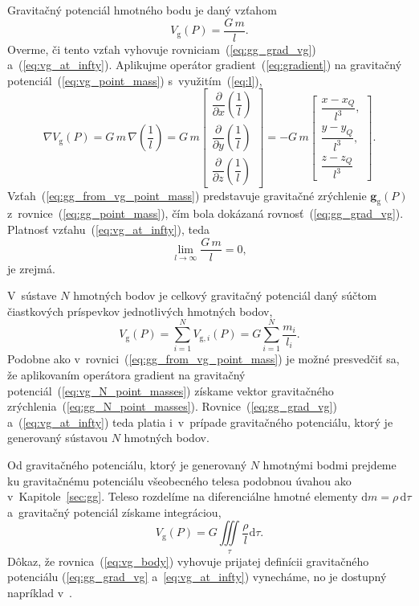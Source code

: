 \documentclass[a4paper,12pt]{book}
\newcommand{\diff}{\mathrm d}
\newcommand{\gidx}{\mathrm g}
\let\vec\mathbf
\begin{document}
Gravitačný potenciál hmotného bodu je daný vzťahom
%
\begin{equation}
\label{eq:vg_point_mass}
V_\gidx(P) = \frac{G \, m}{l}{.}
\end{equation}
%
Overme, či tento vzťah vyhovuje rovniciam~(\ref{eq:gg_grad_vg})
a~(\ref{eq:vg_at_infty}).  Aplikujme operátor gradient~(\ref{eq:gradient})
na gravitačný potenciál~(\ref{eq:vg_point_mass}) s~využitím~(\ref{eq:l}),
%
\begin{equation}
\label{eq:gg_from_vg_point_mass}
\nabla V_\gidx(P) = G \, m \, \nabla \left( \frac{1}{l} \right) =
%
G \, m
\begin{bmatrix}
\dfrac{\partial}{\partial x} \left( \dfrac{1}{l} \right)\\[2ex]
\dfrac{\partial}{\partial y} \left( \dfrac{1}{l} \right)\\[2ex]
\dfrac{\partial}{\partial z} \left( \dfrac{1}{l} \right)
\end{bmatrix}
%
=
%
-G \, m
%
\begin{bmatrix}
\dfrac{x - x_Q}{l^3}{,}\\[2ex]
\dfrac{y - y_Q}{l^3}{,}\\[2ex]
\dfrac{z - z_Q}{l^3}
\end{bmatrix}
{.}
\end{equation}
%
Vzťah~(\ref{eq:gg_from_vg_point_mass}) predstavuje gravitačné zrýchlenie $\vec 
g_\gidx(P)$ z~rovnice~(\ref{eq:gg_point_mass}), čím bola dokázaná 
rovnosť~(\ref{eq:gg_grad_vg}).  Platnosť vzťahu~(\ref{eq:vg_at_infty}), teda
%
\begin{equation}
\lim_{l \to \infty} \frac{G \, m}{l} = 0{,}
\end{equation}
%
je zrejmá.

V~sústave $N$ hmotných bodov je celkový gravitačný potenciál daný súčtom
čiastkových príspevkov jednotlivých hmotných bodov,
%
\begin{equation}
\label{eq:vg_N_point_masses}
V_\gidx(P) = \sum_{i = 1}^{N} V_{\gidx,i}(P) = G \sum_{i = 1}^{N}\frac{
m_i}{l_i}{.}
\end{equation}
%
Podobne ako v~rovnici~(\ref{eq:gg_from_vg_point_mass}) je možné
presvedčiť sa, že aplikovaním operátora gradient na gravitačný
potenciál~(\ref{eq:vg_N_point_masses}) získame vektor gravitačného
zrýchlenia~(\ref{eq:gg_N_point_masses}).  Rovnice~(\ref{eq:gg_grad_vg}) 
a~(\ref{eq:vg_at_infty}) teda platia i~v~prípade gravitačného
potenciálu, ktorý je generovaný sústavou $N$ hmotných bodov.

Od gravitačného potenciálu, ktorý je generovaný $N$ hmotnými bodmi prejdeme ku
gravitačnému potenciálu všeobecného telesa podobnou úvahou ako
v~Kapitole~\ref{sec:gg}.  Teleso rozdelíme na diferenciálne hmotné elementy
$\diff m = \rho \, \diff \tau$ a~gravitačný potenciál získame integráciou,
%
\begin{equation}
\label{eq:vg_body}
V_\gidx(P) = G \iiint\limits_{\tau} \frac{\rho}{l} \diff\tau{.}
\end{equation}
%
Dôkaz, že rovnica~(\ref{eq:vg_body}) vyhovuje prijatej definícii gravitačného
potenciálu (\ref{eq:gg_grad_vg} a~\ref{eq:vg_at_infty}) vynecháme, no je
dostupný napríklad v~\textcite{MacMillan1930}.
\end{document}
